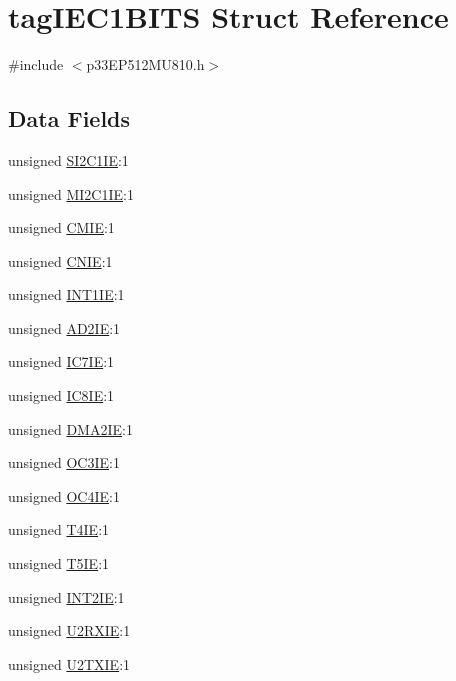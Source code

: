 \hypertarget{structtag_i_e_c1_b_i_t_s}{}\section{tag\+I\+E\+C1\+B\+I\+TS Struct Reference}
\label{structtag_i_e_c1_b_i_t_s}


{\ttfamily \#include $<$p33\+E\+P512\+M\+U810.\+h$>$}

\subsection*{Data Fields}
\begin{DoxyCompactItemize}
\item 
unsigned \hyperlink{structtag_i_e_c1_b_i_t_s_a31f4df5c5c68fe061e1b6e0541fdd2e9}{S\+I2\+C1\+IE}\+:1
\item 
unsigned \hyperlink{structtag_i_e_c1_b_i_t_s_a912f7035b687b0c66fc836ea23ab8f73}{M\+I2\+C1\+IE}\+:1
\item 
unsigned \hyperlink{structtag_i_e_c1_b_i_t_s_a70cc4783b21697eebf908893e71374f8}{C\+M\+IE}\+:1
\item 
unsigned \hyperlink{structtag_i_e_c1_b_i_t_s_a86359da6a074712f5f282bafe3c0d90f}{C\+N\+IE}\+:1
\item 
unsigned \hyperlink{structtag_i_e_c1_b_i_t_s_aa43f84a678c56d6197ff78d6e20de6f3}{I\+N\+T1\+IE}\+:1
\item 
unsigned \hyperlink{structtag_i_e_c1_b_i_t_s_a7a3f6ec48fbd981054ec71ade7686b27}{A\+D2\+IE}\+:1
\item 
unsigned \hyperlink{structtag_i_e_c1_b_i_t_s_abe0015c06bf96e0c3087af3dba5fca21}{I\+C7\+IE}\+:1
\item 
unsigned \hyperlink{structtag_i_e_c1_b_i_t_s_a2075d0de16c28fb815ee8eda9dec3064}{I\+C8\+IE}\+:1
\item 
unsigned \hyperlink{structtag_i_e_c1_b_i_t_s_a549316ab1eda90b38f77d934182fcf76}{D\+M\+A2\+IE}\+:1
\item 
unsigned \hyperlink{structtag_i_e_c1_b_i_t_s_abf42f8ded00a42aaf67342ae5e8dfbe9}{O\+C3\+IE}\+:1
\item 
unsigned \hyperlink{structtag_i_e_c1_b_i_t_s_a7bd19e333010ec710a07e8836250b533}{O\+C4\+IE}\+:1
\item 
unsigned \hyperlink{structtag_i_e_c1_b_i_t_s_a4551b17bdde483842fb4cda7a4d210e6}{T4\+IE}\+:1
\item 
unsigned \hyperlink{structtag_i_e_c1_b_i_t_s_a205aab352b8e3b2af3a6906da3e127bb}{T5\+IE}\+:1
\item 
unsigned \hyperlink{structtag_i_e_c1_b_i_t_s_a40775ef3627f159afeae925fa701ee29}{I\+N\+T2\+IE}\+:1
\item 
unsigned \hyperlink{structtag_i_e_c1_b_i_t_s_ab399ed98ccb6f1df0efbdfbee0288970}{U2\+R\+X\+IE}\+:1
\item 
unsigned \hyperlink{structtag_i_e_c1_b_i_t_s_a32927ec0d2912392431d29e95328d35f}{U2\+T\+X\+IE}\+:1
\end{DoxyCompactItemize}


